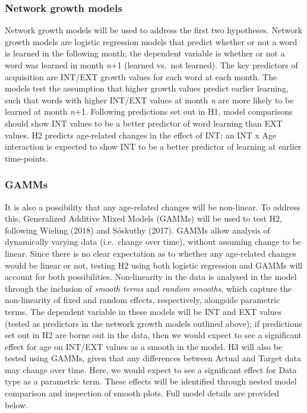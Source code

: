 \documentclass[
  man]{apa6}
\begin{document}
\hypertarget{network-growth-models}{%
\subsubsection{Network growth models}\label{network-growth-models}}

Network growth models will be used to address the first two hypotheses. Network growth models are logistic regression models that predict whether or not a word is learned in the following month; the dependent variable is whether or not a word was learned in month \emph{n}+1 (learned vs.~not learned). The key predictors of acquisition are INT/EXT growth values for each word at each month. The models test the assumption that higher growth values predict earlier learning, such that words with higher INT/EXT values at month \emph{n} are more likely to be learned at month \emph{n}+1. Following predictions set out in H1, model comparisons should show INT values to be a better predictor of word learning than EXT values. H2 predicts age-related changes in the effect of INT; an INT x Age interaction is expected to show INT to be a better predictor of learning at earlier time-points.

\hypertarget{gamms}{%
\subsubsection{GAMMs}\label{gamms}}

It is also a possibility that any age-related changes will be non-linear. To address this, Generalized Additive Mixed Models (GAMMs) will be used to test H2, following Wieling (2018) and Sóskuthy (2017). GAMMs allow analysis of dynamically varying data (i.e.~change over time), without assuming change to be linear. Since there is no clear expectation as to whether any age-related changes would be linear or not, testing H2 using both logistic regression and GAMMs will account for both possibilities. Non-linearity in the data is analysed in the model through the inclusion of \emph{smooth terms} and \emph{random smooths}, which capture the non-linearity of fixed and random effects, respectively, alongside parametric terms. The dependent variable in these models will be INT and EXT values (tested as predictors in the network growth models outlined above); if predictions set out in H2 are borne out in the data, then we would expect to see a significant effect for age on INT/EXT values as a smooth in the model. H3 will also be tested using GAMMs, given that any differences between Actual and Target data may change over time. Here, we would expect to see a significant effect for Data type as a parametric term. These effects will be identified through nested model comparison and inspection of smooth plots. Full model details are provided below.
\end{document}
